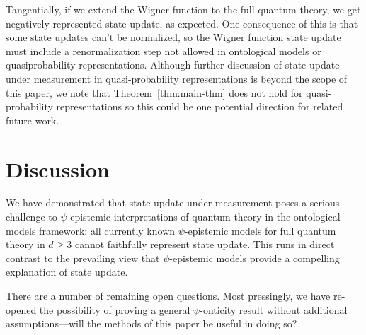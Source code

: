 \documentclass[%
 reprint, onecolumn, 12pt,
superscriptaddress,
nofootinbib,
 prx, 
]{quantumarticle}
\newcommand{\Z}{\mathbb{Z}}
\renewcommand{\Pr}{\textup{Pr}}
\newcommand{\proj}[1]{{\bm[}#1{\bm]}}
\begin{document}
Tangentially, if we extend the Wigner function to the full quantum
theory, we get negatively represented state update, as expected. One
consequence of this is that some state updates can't be normalized, so
the Wigner function state update must include a renormalization step
not allowed in ontological models or quasiprobability representations.
Although further discussion of state update under measurement in
quasi-probability representations is beyond the scope of this paper,
we note that Theorem~\ref{thm:main-thm} does not hold for
quasi-probability representations so this could be one potential
direction for related future work.


\section{Discussion}
\label{sec:discussion}
  
We have demonstrated that state update under measurement poses a
serious challenge to $\psi$-epistemic interpretations of quantum
theory in the ontological models framework: all currently known
$\psi$-epistemic models for full quantum theory in $d\geq3$ cannot
faithfully represent state update. This runs in direct contrast to the
prevailing view that $\psi$-epistemic models provide a compelling
explanation of state update.

There are a number of remaining open questions. Most pressingly, we
have re-opened the possibility of proving a general $\psi$-onticity
result without additional assumptions---will the methods of this paper be
useful in doing so?
\end{document}
